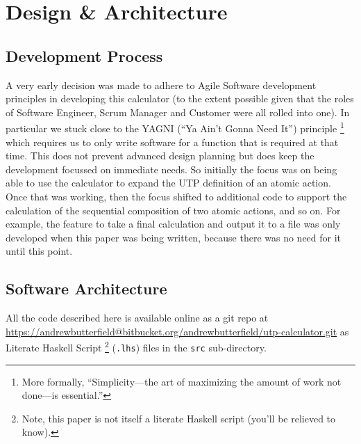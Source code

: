 \section{Design \& Architecture}\label{sec:Design}

\subsection{Development Process}\label{ssec:development}

A very early decision was made to adhere to Agile Software development
principles\cite{Fowl01a} in developing this calculator
(to the extent possible given that the roles of Software Engineer, Scrum Manager
and Customer were all rolled into one).
In particular we stuck close to the YAGNI (``Ya Ain't Gonna Need It'') principle%
\footnote{More formally, ``Simplicity---the art of maximizing the amount
of work not done---is essential.''}
which requires us to only write software for a function
that is required at that time.
This does not prevent advanced design planning but does keep
the development focussed on immediate needs.
So initially the focus was on being able to use the calculator
to expand the UTP definition of an atomic action.
Once that was working, then the focus shifted to additional code to
support the calculation of the sequential composition of two atomic actions,
and so on.
For example, the feature to take a final calculation and output it to a file
was only developed when this paper was being written,
because there was no need for it until this point.

\subsection{Software Architecture}\label{ssec:architecture}

All the code described here is available online as a git repo
at
\\\url{https://andrewbutterfield@bitbucket.org/andrewbutterfield/utp-calculator.git}
as Literate Haskell Script%
\footnote{
Note, this paper is not itself a literate Haskell script
(you'll be relieved to know).
}
(\texttt{.lhs}) files in the \texttt{src} sub-directory.

